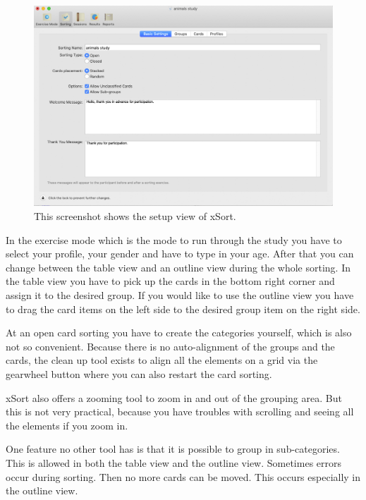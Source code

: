 \begin{figure}[h] 
\centering
\includegraphics[keepaspectratio,width=460px]{images/xsort-setup.png}
\caption[xSort Setup] { This screenshot shows the setup view of xSort.
 }
\label{fig:xSort-setup}
\end{figure}

In the exercise mode which is the mode to run through the study you have to select your profile, 
your gender and have to type in your age. After that you can change between 
the table view and an outline view during the whole sorting. In the table view you have to pick up 
the cards in the bottom right corner and assign it to the desired group. If you would like to use the 
outline view you have to drag the card items on the left side to the desired group item on the right side. 

At an open card sorting you have to create the categories yourself, which is also not so 
convenient. Because there is no auto-alignment of the groups and the cards, the clean up 
tool exists to align all the elements on a grid via the gearwheel button where you can also restart 
the card sorting. 

xSort also offers a zooming tool to zoom in and out
of the grouping area. But this is not very practical, because you have troubles with scrolling and 
seeing all the elements if you zoom in. 

One feature no other tool has is that it is possible to group in sub-categories. This is allowed in 
both the table view and the outline view. Sometimes errors occur during sorting. Then no more 
cards can be moved. This occurs especially in the outline view.

